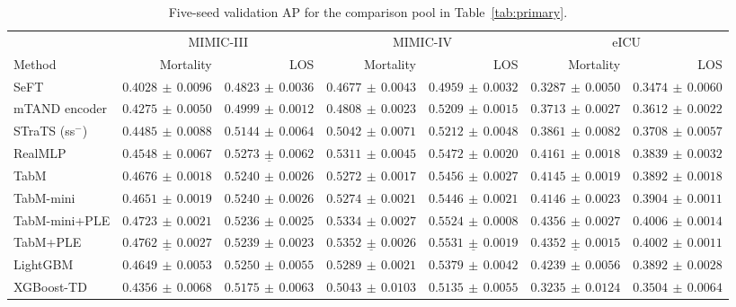 \begin{table}[tp]
\centering\footnotesize
\setlength{\tabcolsep}{3pt}
\caption{Five-seed validation AP for the comparison pool in Table~\ref{tab:primary}.}
\label{tab:development}
\begin{tabular}{lrrrrrr}
\toprule
& \multicolumn{2}{c}{MIMIC-III} & \multicolumn{2}{c}{MIMIC-IV} & \multicolumn{2}{c}{eICU} \\
\cmidrule(lr){2-3}\cmidrule(lr){4-5}\cmidrule(lr){6-7}
Method & Mortality & LOS & Mortality & LOS & Mortality & LOS \\
\midrule
SeFT & $0.4028\,\pm\,0.0096$ & $0.4823\,\pm\,0.0036$ & $0.4677\,\pm\,0.0043$ & $0.4959\,\pm\,0.0032$ & $0.3287\,\pm\,0.0050$ & $0.3474\,\pm\,0.0060$ \\
mTAND encoder & $0.4275\,\pm\,0.0050$ & $0.4999\,\pm\,0.0012$ & $0.4808\,\pm\,0.0023$ & $0.5209\,\pm\,0.0015$ & $0.3713\,\pm\,0.0027$ & $0.3612\,\pm\,0.0022$ \\
STraTS (ss$^{-}$) & $0.4485\,\pm\,0.0088$ & $0.5144\,\pm\,0.0064$ & $0.5042\,\pm\,0.0071$ & $0.5212\,\pm\,0.0048$ & $0.3861\,\pm\,0.0082$ & $0.3708\,\pm\,0.0057$ \\
RealMLP & $0.4548\,\pm\,0.0067$ & $\underline{0.5273\,\pm\,0.0062}$ & $0.5311\,\pm\,0.0045$ & $0.5472\,\pm\,0.0020$ & $0.4161\,\pm\,0.0018$ & $0.3839\,\pm\,0.0032$ \\
TabM & $0.4676\,\pm\,0.0018$ & $0.5240\,\pm\,0.0026$ & $0.5272\,\pm\,0.0017$ & $0.5456\,\pm\,0.0027$ & $0.4145\,\pm\,0.0019$ & $0.3892\,\pm\,0.0018$ \\
TabM-mini & $0.4651\,\pm\,0.0019$ & $0.5240\,\pm\,0.0026$ & $0.5274\,\pm\,0.0021$ & $0.5446\,\pm\,0.0021$ & $0.4146\,\pm\,0.0023$ & $0.3904\,\pm\,0.0011$ \\
TabM-mini+PLE & $0.4723\,\pm\,0.0021$ & $0.5236\,\pm\,0.0025$ & $0.5334\,\pm\,0.0027$ & $0.5524\,\pm\,0.0008$ & $\mathbf{0.4356\,\pm\,0.0027}$ & $\mathbf{0.4006\,\pm\,0.0014}$ \\
TabM+PLE & $\underline{0.4762\,\pm\,0.0027}$ & $0.5239\,\pm\,0.0023$ & $\underline{0.5352\,\pm\,0.0026}$ & $\underline{0.5531\,\pm\,0.0019}$ & $\underline{0.4352\,\pm\,0.0015}$ & $0.4002\,\pm\,0.0011$ \\
LightGBM & $0.4649\,\pm\,0.0053$ & $0.5250\,\pm\,0.0055$ & $0.5289\,\pm\,0.0021$ & $0.5379\,\pm\,0.0042$ & $0.4239\,\pm\,0.0056$ & $0.3892\,\pm\,0.0028$ \\
XGBoost-TD & $0.4356\,\pm\,0.0068$ & $0.5175\,\pm\,0.0063$ & $0.5043\,\pm\,0.0103$ & $0.5135\,\pm\,0.0055$ & $0.3235\,\pm\,0.0124$ & $0.3504\,\pm\,0.0064$ \\

\end{tabular}
\end{table}
